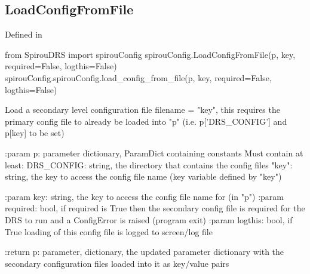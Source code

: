 \noindent\begin{minipage}{\textwidth}
\subsection{LoadConfigFromFile}

Defined in \spirouConfig{}

\begin{pythonbox}
from SpirouDRS import spirouConfig
spirouConfig.LoadConfigFromFile(p, key, required=False, logthis=False)
spirouConfig.spirouConfig.load_config_from_file(p, key, required=False, logthis=False)
\end{pythonbox}

\begin{pythondocstring}
Load a secondary level configuration file filename = "key", this requires
the primary config file to already be loaded into "p"
(i.e. p['DRS_CONFIG'] and p[key] to be set)

:param p: parameter dictionary, ParamDict containing constants
    Must contain at least:
            DRS_CONFIG: string, the directory that contains the config files
            "key": string, the key to access the config file name
                   (key variable defined by "key")

:param key: string, the key to access the config file name for (in "p")
:param required: bool, if required is True then the secondary config file
                 is required for the DRS to run and a ConfigError is raised
                 (program exit)
:param logthis: bool, if True loading of this config file is logged to
                screen/log file

:return p: parameter, dictionary, the updated parameter dictionary with
           the secondary configuration files loaded into it as key/value
           pairs
\end{pythondocstring}
\end{minipage}

